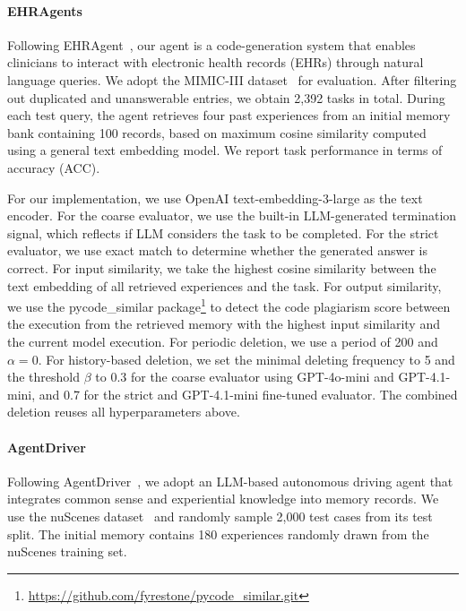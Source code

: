 \documentclass[11pt]{article}
\theoremstyle{plain}
\theoremstyle{definition}
\begin{document}
{\paragraph{EHRAgents}
Following EHRAgent~\cite{shi2024ehragent}, our agent is a code-generation system that enables clinicians to interact with electronic health records (EHRs) through natural language queries. We adopt the MIMIC-III dataset~\cite{2016NatSD...360035J} for evaluation. After filtering out duplicated and unanswerable entries, we obtain 2,392 tasks in total. During each test query, the agent retrieves four past experiences from an initial memory bank containing 100 records, based on maximum cosine similarity computed using a general text embedding model. We report task performance in terms of accuracy (ACC).

For our implementation, we use OpenAI text-embedding-3-large as the text encoder.
For the coarse evaluator, we use the built-in LLM-generated termination signal, which reflects if LLM considers the task to be completed. 
For the strict evaluator, we use exact match to determine whether the generated answer is correct.
For input similarity, we take the highest cosine similarity between the text embedding of all retrieved experiences and the task.
For output similarity, we use the pycode\_similar package\footnote{\url{https://github.com/fyrestone/pycode_similar.git}} to detect the code plagiarism score between the execution from the retrieved memory with the highest input similarity and the current model execution. 
For periodic deletion, we use a period of 200 and $\alpha = 0$.
For history-based deletion, we set the minimal deleting frequency to 5 and the threshold $\beta$ to 0.3 for the coarse evaluator using GPT-4o-mini and GPT-4.1-mini, and 0.7 for the strict and GPT-4.1-mini fine-tuned evaluator.
The combined deletion reuses all hyperparameters above.

\paragraph{AgentDriver}
Following AgentDriver~\cite{mao2023language}, we adopt an LLM-based autonomous driving agent that integrates common sense and experiential knowledge into memory records. We use the nuScenes dataset~\cite{caesar2020nuscenes} and randomly sample 2,000 test cases from its test split. The initial memory contains 180 experiences randomly drawn from the nuScenes training set.

}
\end{document}
